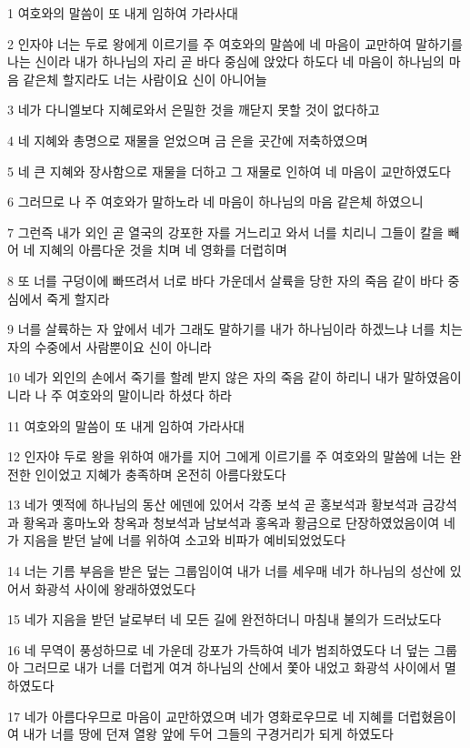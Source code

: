 \par 1 여호와의 말씀이 또 내게 임하여 가라사대
\par 2 인자야 너는 두로 왕에게 이르기를 주 여호와의 말씀에 네 마음이 교만하여 말하기를 나는 신이라 내가 하나님의 자리 곧 바다 중심에 앉았다 하도다 네 마음이 하나님의 마음 같은체 할지라도 너는 사람이요 신이 아니어늘
\par 3 네가 다니엘보다 지혜로와서 은밀한 것을 깨닫지 못할 것이 없다하고
\par 4 네 지혜와 총명으로 재물을 얻었으며 금 은을 곳간에 저축하였으며
\par 5 네 큰 지혜와 장사함으로 재물을 더하고 그 재물로 인하여 네 마음이 교만하였도다
\par 6 그러므로 나 주 여호와가 말하노라 네 마음이 하나님의 마음 같은체 하였으니
\par 7 그런즉 내가 외인 곧 열국의 강포한 자를 거느리고 와서 너를 치리니 그들이 칼을 빼어 네 지혜의 아름다운 것을 치며 네 영화를 더럽히며
\par 8 또 너를 구덩이에 빠뜨려서 너로 바다 가운데서 살륙을 당한 자의 죽음 같이 바다 중심에서 죽게 할지라
\par 9 너를 살륙하는 자 앞에서 네가 그래도 말하기를 내가 하나님이라 하겠느냐 너를 치는 자의 수중에서 사람뿐이요 신이 아니라
\par 10 네가 외인의 손에서 죽기를 할례 받지 않은 자의 죽음 같이 하리니 내가 말하였음이니라 나 주 여호와의 말이니라 하셨다 하라
\par 11 여호와의 말씀이 또 내게 임하여 가라사대
\par 12 인자야 두로 왕을 위하여 애가를 지어 그에게 이르기를 주 여호와의 말씀에 너는 완전한 인이었고 지혜가 충족하며 온전히 아름다왔도다
\par 13 네가 옛적에 하나님의 동산 에덴에 있어서 각종 보석 곧 홍보석과 황보석과 금강석과 황옥과 홍마노와 창옥과 청보석과 남보석과 홍옥과 황금으로 단장하였었음이여 네가 지음을 받던 날에 너를 위하여 소고와 비파가 예비되었었도다
\par 14 너는 기름 부음을 받은 덮는 그룹임이여 내가 너를 세우매 네가 하나님의 성산에 있어서 화광석 사이에 왕래하였었도다
\par 15 네가 지음을 받던 날로부터 네 모든 길에 완전하더니 마침내 불의가 드러났도다
\par 16 네 무역이 풍성하므로 네 가운데 강포가 가득하여 네가 범죄하였도다 너 덮는 그룹아 그러므로 내가 너를 더럽게 여겨 하나님의 산에서 쫓아 내었고 화광석 사이에서 멸하였도다
\par 17 네가 아름다우므로 마음이 교만하였으며 네가 영화로우므로 네 지혜를 더럽혔음이여 내가 너를 땅에 던져 열왕 앞에 두어 그들의 구경거리가 되게 하였도다
